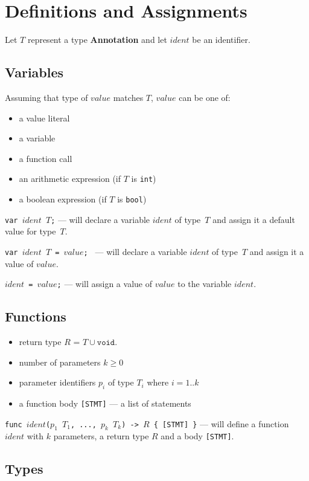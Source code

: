\documentclass{article}
\begin{document}
\section{Definitions and Assignments}
\label{def}
Let $T$ represent a type \textbf{Annotation} and let $ident$ be an identifier.

\subsection{Variables}
Assuming that type of $value$ matches $T$, $value$ can be one of:
\begin{itemize}
  \setlength\itemsep{.1em}
  \item a value literal
  \item a variable
  \item a function call
  \item an arithmetic expression (if $T$ is \texttt{int})
  \item a boolean expression (if $T$ is \texttt{bool})
\end{itemize}

\texttt{var $ident$ $T$;} --- will declare a variable $ident$ of type~$T$ and
assign it a default value for type~$T$.

\texttt{var $ident$ $T$ = $value$; } --- will declare a variable $ident$ of
type~$T$ and assign it a value of $value$.

\texttt{$ident$ = $value$;} --- will assign a value of $value$ to the variable
$ident$.

\subsection{Functions}
\label{def-functions}
\begin{itemize}
  \setlength\itemsep{.1em}
  \item return type $R$ = $T \cup { \texttt{void} }$.
  \item number of parameters $k \geq 0$
  \item parameter identifiers $p_i$ of type $T_i$ where $i = 1..k$
  \item a function body \texttt{[STMT]} --- a list of statements
\end{itemize}

\texttt{func $ident$($p_1$ $T_1$, ..., $p_k$ $T_k$) -> $R$ \{ [STMT] \}} --- will
define a function $ident$ with $k$ parameters, a return type $R$ and a body
\texttt{[STMT]}.

\subsection{Types}
\end{document}
